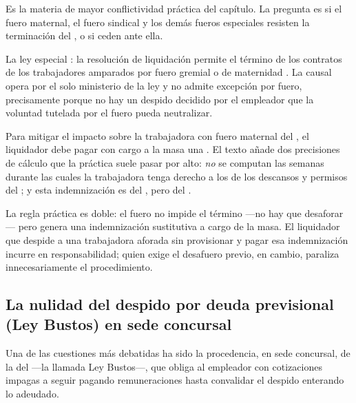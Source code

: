 Es la materia de mayor conflictividad práctica del capítulo. La pregunta es si el fuero
maternal, el fuero sindical y los demás fueros especiales resisten la terminación del
, o si ceden ante ella.

La ley especial : la resolución de
liquidación permite el término de los contratos de los trabajadores amparados por fuero
gremial o de maternidad .
La causal opera por el solo ministerio de la ley y no admite excepción por fuero, precisamente
porque no hay un despido decidido por el empleador que la voluntad tutelada por el fuero pueda
neutralizar.

Para mitigar el impacto sobre la trabajadora con fuero maternal del , el liquidador
debe pagar con cargo a la masa una . El texto añade dos precisiones
de cálculo que la práctica suele pasar por alto: \emph{no} se computan las semanas durante las
cuales la trabajadora tenga derecho a los  de los descansos y permisos del
; y esta indemnización es  del , pero  del .

\begin{foco}
La regla práctica es doble: el fuero no impide el término ---no hay que desaforar--- pero
genera una indemnización sustitutiva a cargo de la masa. El liquidador que despide a una
trabajadora aforada sin provisionar y pagar esa indemnización incurre en responsabilidad;
quien exige el desafuero previo, en cambio, paraliza innecesariamente el procedimiento.
\end{foco}

\subsection{La nulidad del despido por deuda previsional (Ley Bustos) en sede concursal}

Una de las cuestiones más debatidas ha sido la procedencia, en sede concursal, de la
 del  ---la llamada Ley
Bustos---, que obliga al empleador con cotizaciones impagas a seguir pagando remuneraciones
hasta convalidar el despido enterando lo adeudado.

